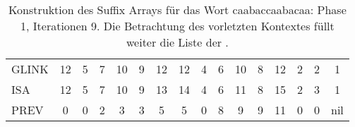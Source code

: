 \begin{table}[H]
\begin{adjustbox}{max width=\textwidth}
\begin{tabular}{lccccccccccccccc}
\multicolumn{1}{l|}{GLINK}   & 12                      & 5                         & 7                         & 10                         & 9                           & 12                        & 12                         & 4                       & 6                        & 10 & 8                       & 12 & 2                         & 2                         & 1   \\
\multicolumn{1}{l|}{ISA}     & 12                      & 5                         & 7                         & 10                         & 9                           & 13                        & 14                         & 4                       & 6                        & 11 & 8                       & 15 & 2                         & 3                         & 1   \\
\multicolumn{1}{l|}{PREV}    & 0                       & 0                         & 2                         & 3                          & 3                           & 5                         & 5                          & 0                       & 8                        & 9  & 9                       & 11 & \cellcolor[HTML]{\red}0 & \cellcolor[HTML]{\red}0 & nil
\end{tabular}
\end{adjustbox}

\caption[Konstruktion des Suffix Arrays f{\"u}r das Wort caabaccaabacaa: Phase 1, Iterationen 9]{Konstruktion des Suffix Arrays f{\"u}r das Wort caabaccaabacaa: Phase 1, Iterationen 9. Die Betrachtung des vorletzten Kontextes f{\"u}llt weiter die Liste der \prevpointer.}
\label{table_complex_example_1_9} 
\end{table}

